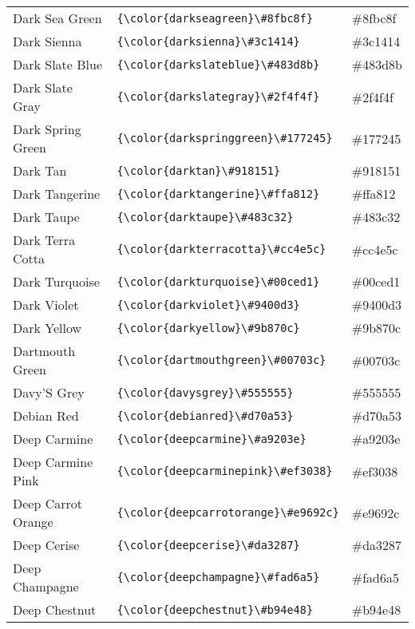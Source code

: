 \documentclass[9.5pt]{article}
\begin{document}
\begin{longtable}{l | l | l}
	Dark Sea Green & \verb!{\color{darkseagreen}\#8fbc8f}! & {\color{darkseagreen}\#8fbc8f}\\
	Dark Sienna & \verb!{\color{darksienna}\#3c1414}! & {\color{darksienna}\#3c1414}\\
	Dark Slate Blue & \verb!{\color{darkslateblue}\#483d8b}! & {\color{darkslateblue}\#483d8b}\\
	Dark Slate Gray & \verb!{\color{darkslategray}\#2f4f4f}! & {\color{darkslategray}\#2f4f4f}\\
	Dark Spring Green & \verb!{\color{darkspringgreen}\#177245}! & {\color{darkspringgreen}\#177245}\\
	Dark Tan & \verb!{\color{darktan}\#918151}! & {\color{darktan}\#918151}\\
	Dark Tangerine & \verb!{\color{darktangerine}\#ffa812}! & {\color{darktangerine}\#ffa812}\\
	Dark Taupe & \verb!{\color{darktaupe}\#483c32}! & {\color{darktaupe}\#483c32}\\
	Dark Terra Cotta & \verb!{\color{darkterracotta}\#cc4e5c}! & {\color{darkterracotta}\#cc4e5c}\\
	Dark Turquoise & \verb!{\color{darkturquoise}\#00ced1}! & {\color{darkturquoise}\#00ced1}\\
	Dark Violet & \verb!{\color{darkviolet}\#9400d3}! & {\color{darkviolet}\#9400d3}\\
	Dark Yellow & \verb!{\color{darkyellow}\#9b870c}! & {\color{darkyellow}\#9b870c}\\
	Dartmouth Green & \verb!{\color{dartmouthgreen}\#00703c}! & {\color{dartmouthgreen}\#00703c}\\
	Davy'S Grey & \verb!{\color{davysgrey}\#555555}! & {\color{davysgrey}\#555555}\\
	Debian Red & \verb!{\color{debianred}\#d70a53}! & {\color{debianred}\#d70a53}\\
	Deep Carmine & \verb!{\color{deepcarmine}\#a9203e}! & {\color{deepcarmine}\#a9203e}\\
	Deep Carmine Pink & \verb!{\color{deepcarminepink}\#ef3038}! & {\color{deepcarminepink}\#ef3038}\\
	Deep Carrot Orange & \verb!{\color{deepcarrotorange}\#e9692c}! & {\color{deepcarrotorange}\#e9692c}\\
	Deep Cerise & \verb!{\color{deepcerise}\#da3287}! & {\color{deepcerise}\#da3287}\\
	Deep Champagne & \verb!{\color{deepchampagne}\#fad6a5}! & {\color{deepchampagne}\#fad6a5}\\
	Deep Chestnut & \verb!{\color{deepchestnut}\#b94e48}! & {\color{deepchestnut}\#b94e48}\\

\end{longtable}
\end{document}
